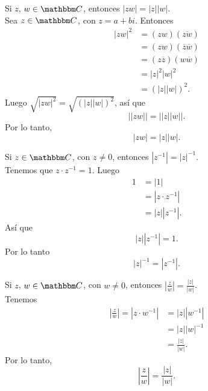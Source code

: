 \begin{theorem}
    Si $z$, $w \in \CC$, entonces $|zw|=|z||w|$. \\
    \demostracion Sea $z \in \CC$, con $z=a+bi$. Entonces
    \begin{align*}
        |zw|^2 &=(zw)\left( \overline{zw} \right) \\
        &=(zw)(\overline{z} \overline{w}) \\
        &=(z \overline{z})(w \overline{w}) \\
        &=|z|^2 |w|^2 \\
        &=(|z| |w|)^2.
    \end{align*}
    Luego $\sqrt{|zw|^2}=\sqrt{(|z| |w|)^2}$, así que
    $$\big| |zw| \big| =\big| |z| |w| \big|.$$
    Por lo tanto,
    $$|zw|=|z| |w|.$$
\end{theorem}

\newpage

\begin{proposition}
    Si $z \in \CC$, con $z \neq 0$, entonces $\left| z^{-1} \right| =|z|^{-1}$. \\
    \demostracion Tenemos que $z \cdot z^{-1}=1$. Luego
    \begin{align*}
        1 &=|1| \\
        &=\left| z \cdot z^{-1} \right| \\
        &=|z| \left| z^{-1} \right|.
    \end{align*}
    Así que
    $$|z| \left| z^{-1} \right| = 1.$$
    Por lo tanto
    $$|z|^{-1}=\left| z^{-1} \right|.$$
\end{proposition}

\begin{proposition}
    Si $z$, $w \in \CC$, con $w \neq 0$, entonces $\displaystyle \left| \frac{z}{w} \right| =\frac{|z|}{|w|}$. \\
    \demostracion Tenemos
    \begin{align*}
        \left| \frac{z}{w} \right| =\left| z \cdot w^{-1} \right|  &=|z| \left| w^{-1} \right| \\
        &=|z| \left| w \right| ^{-1} \\
        &=\frac{|z|}{|w|}.
    \end{align*}
    Por lo tanto,
    $$\left| \frac{z}{w} \right| =\frac{|z|}{|w|}.$$
\end{proposition}

